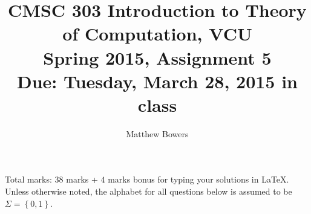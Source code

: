 \documentclass{article}
\author{Matthew Bowers}
\newcommand{\set}[1]{{\left\{#1\right\}}}    %
\begin{document}
\title{CMSC 303 Introduction to Theory of Computation, VCU\\Spring 2015, Assignment 5\\Due: Tuesday, March 28, 2015 in class}
\date{}
\maketitle
\vspace{-5mm}
\noindent Total marks: $38$ marks + $4$ marks bonus for typing your solutions in LaTeX.\vspace{2mm}\\

\noindent Unless otherwise noted, the alphabet for all questions below is assumed to be $\Sigma=\set{0,1}$.
\end{document}
